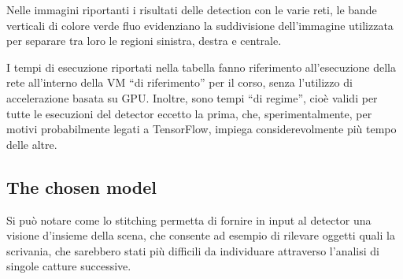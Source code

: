 Nelle immagini riportanti i risultati delle detection con le varie reti, le bande verticali di colore verde fluo evidenziano la suddivisione dell’immagine utilizzata per separare tra loro le regioni sinistra, destra e centrale.

I tempi di esecuzione riportati nella tabella fanno riferimento all’esecuzione della rete all’interno della VM “di riferimento” per il corso, senza l’utilizzo di accelerazione basata su GPU. Inoltre, sono tempi “di regime”, cioè validi per tutte le esecuzioni del detector eccetto la prima, che, sperimentalmente, per motivi probabilmente legati a TensorFlow, impiega considerevolmente più tempo delle altre.

\subsection{The chosen model}

Si può notare come lo stitching permetta di fornire in input al detector una visione d’insieme della scena, che consente ad esempio di rilevare oggetti quali la scrivania, che sarebbero stati più difficili da individuare attraverso l’analisi di singole catture successive.
